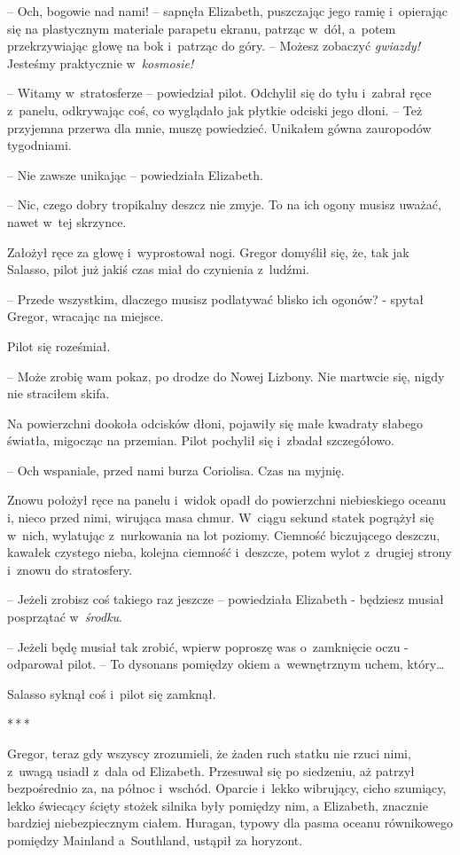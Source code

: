 \documentclass[oneside,polish,12pt,sfheadings]{mwbk}
\newcommand{\threeast}{\bigskip\par\centerline{*\,*\,*}\medskip\par}%
\begin{document}
-- Och, bogowie nad nami! -- sapnęła Elizabeth, puszczając jego ramię i~opierając się na plastycznym materiale parapetu ekranu, patrząc w~dół, a~potem przekrzywiając głowę na bok i~patrząc do góry. -- Możesz zobaczyć
\emph{ gwiazdy! } Jesteśmy praktycznie w~\emph{kosmosie!}

-- Witamy w~stratosferze -- powiedział pilot. Odchylił się do tyłu i~zabrał ręce z~panelu, odkrywając coś, co wyglądało jak płytkie odciski
jego dłoni. -- Też przyjemna przerwa dla mnie, muszę powiedzieć. Unikałem
gówna zauropodów tygodniami.

-- Nie zawsze unikając -- powiedziała Elizabeth.

-- Nic, czego dobry tropikalny deszcz nie zmyje. To na ich ogony musisz
uważać, nawet w~tej skrzynce.

Założył ręce za głowę i~wyprostował nogi. Gregor domyślił się, że, tak
jak Salasso, pilot już jakiś czas miał do czynienia z~ludźmi.

-- Przede wszystkim, dlaczego musisz podlatywać blisko ich ogonów? -
spytał Gregor, wracając na miejsce.

Pilot się roześmiał. 

-- Może zrobię wam pokaz, po drodze do Nowej
Lizbony. Nie martwcie się, nigdy nie straciłem skifa.

Na powierzchni dookoła odcisków dłoni, pojawiły się małe kwadraty
słabego światła, migocząc na przemian. Pilot pochylił się i~zbadał
szczegółowo.

-- Och wspaniale, przed nami burza Coriolisa. Czas na myjnię.

Znowu położył ręce na panelu i~widok opadł do powierzchni niebieskiego
oceanu i, nieco przed nimi, wirująca masa chmur. W~ciągu sekund statek
pogrążył się w~nich, wylatując z~nurkowania na lot poziomy. Ciemność
biczującego deszczu, kawałek czystego nieba, kolejna ciemność i~deszcze,
potem wylot z~drugiej strony i~znowu do stratosfery.

-- Jeżeli zrobisz coś takiego raz jeszcze -- powiedziała Elizabeth -
będziesz musiał posprzątać w~\emph{środku}.

-- Jeżeli będę musiał tak zrobić, wpierw poproszę was o~zamknięcie oczu -
odparował pilot. -- To dysonans pomiędzy okiem a~wewnętrznym uchem,
który\ldots

Salasso syknął coś i~pilot się zamknął.

\threeast

Gregor, teraz gdy wszyscy zrozumieli, że żaden ruch statku nie rzuci
nimi, z~uwagą usiadł z~dala od Elizabeth. Przesuwał się po siedzeniu, aż
patrzył bezpośrednio za, na północ i~wschód. Oparcie i~lekko wibrujący,
cicho szumiący, lekko świecący ścięty stożek silnika były pomiędzy nim,
a Elizabeth, znacznie bardziej niebezpiecznym ciałem. Huragan, typowy
dla pasma oceanu równikowego pomiędzy Mainland a~Southland, ustąpił za
horyzont.
\end{document}
